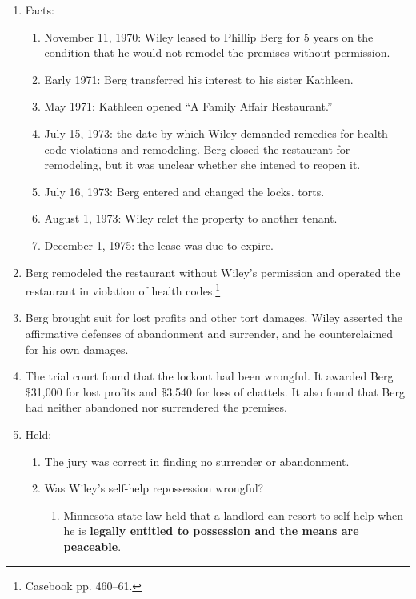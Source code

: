 \begin{enumerate}
    \item Facts:
    \begin{enumerate}
        \item November 11, 1970: Wiley leased to Phillip Berg for 5 years on 
        the condition that he would not remodel the premises without 
        permission.
        \item Early 1971: Berg transferred his interest to his sister 
        Kathleen.
        \item May 1971: Kathleen opened ``A Family Affair Restaurant.''
        \item July 15, 1973: the date by which Wiley demanded remedies for
        health code violations and remodeling. Berg closed the restaurant for 
        remodeling, but it was unclear whether she intened to reopen it.
        \item July 16, 1973: Berg entered and changed the locks.
        torts.
        \item August 1, 1973: Wiley relet the property to another tenant.
        \item December 1, 1975: the lease was due to expire.
    \end{enumerate}
    \item Berg remodeled the restaurant without Wiley's permission and 
    operated the restaurant in violation of health codes.\footnote{Casebook 
    pp. 460--61.}
    \item Berg brought suit for lost profits and other tort damages. Wiley 
    asserted the affirmative defenses of abandonment and surrender, and he 
    counterclaimed for his own damages. 
    \item The trial court found that the lockout had been wrongful. It awarded 
    Berg \$31,000 for lost profits and \$3,540 for loss of chattels. It also 
    found that Berg had neither abandoned nor surrendered the premises.
    \item Held:
    \begin{enumerate}
        \item The jury was correct in finding no surrender or abandonment.
        \item Was Wiley's self-help repossession wrongful?
        \begin{enumerate}
            \item Minnesota state law held that a landlord can resort to 
            self-help when he is \textbf{legally entitled to possession and 
            the means are peaceable}.

\end{enumerate}
\end{enumerate}
\end{enumerate}
